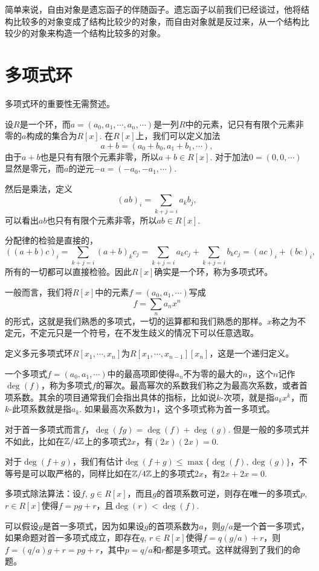 简单来说，自由对象是遗忘函子的伴随函子。遗忘函子以前我们已经谈过，他将结构比较多的对象变成了结构比较少的对象，而自由对象就是反过来，从一个结构比较少的对象来构造一个结构比较多的对象。

\para 

\section{多项式环}

多项式环的重要性无需赘述。

\para 设$R$是一个环，而$a=(a_0,a_1,\cdots,a_n,\cdots)$是一列$R$中的元素，记只有有限个元素非零的$a$构成的集合为$R[x]$. 在$R[x]$上，我们可以定义加法
\[
	a+b=(a_0+b_0,a_1+b_1,\cdots),
\]
由于$a+b$也是只有有限个元素非零，所以$a+b \in R[x]$. 对于加法$0=(0,0,\cdots)$显然是零元，而$a$的逆元$-a=(-a_0,-a_1,\cdots)$.

然后是乘法，定义
\[
	(ab)_i=\sum_{k+j=i}a_kb_j,
\]
可以看出$ab$也只有有限个元素非零，所以$ab\in R[x]$.

分配律的检验是直接的，
\[
	((a+b)c)_i=\sum_{k+j=i}(a+b)_kc_j=\sum_{k+j=i}a_kc_j+\sum_{k+j=i}b_kc_j=(ac)_i+(bc)_i,
\]
所有的一切都可以直接检验。因此$R[x]$确实是一个环，称为多项式环。

一般而言，我们将$R[x]$中的元素$f=(a_0,a_1,\cdots)$写成
\[
	f=\sum_{n}a_n x^n
\]
的形式，这就是我们熟悉的多项式，一切的运算都和我们熟悉的那样。$x$称之为不定元，不定元只是一个符号，在不发生歧义的情况下可以任意选取。

\para 定义多元多项式环$R[x_1,\cdots,x_n]$为$R[x_1,\cdots,x_{n-1}][x_n]$，这是一个递归定义。

\para 一个多项式$f=(a_0,a_1,\cdots)$中的最高项即使得$a_n$不为零的最大的$n$，这个$n$记作$\deg(f)$，称为多项式$f$的幂次。最高幂次的系数我们称之为最高次系数，或者首项系数。其余的项目通常我们会指出具体的指标，比如说$k$-次项，就是指$a_kx^k$，而$k$-此项系数就是指$a_k$. 如果最高次系数为$1$，这个多项式称为首一多项式。

对于首一多项式而言$f$，$\deg(fg)=\deg(f)+\deg(g)$. 但是一般的多项式并不如此，比如在$\mathbb{Z}/4\mathbb{Z}$上的多项式$2x$，有$(2x)(2x)=0$.

对于$\deg(f+g)$，我们有估计$\deg(f+g)\leq \max\{\deg(f),\deg(g)\}$，不等号是可以取严格的，同样比如在$\mathbb{Z}/4\mathbb{Z}$上的多项式$2x$，有$2x+2x=0$.

\theo 多项式除法算法：设$f$, $g\in R[x]$，而且$g$的首项系数可逆，则存在唯一的多项式$p$, $r\in R[x]$使得$f=pg+r$，且$\deg(r)< \deg(f)$.

\proof
	可以假设$g$是首一多项式，因为如果设$g$的首项系数为$a$，则$g/a$是一个首一多项式，如果命题对首一多项式成立，即存在$q$, $r\in R[x]$使得$f=q(g/a)+r$，则$f=(q/a)g+r=pg+r$，其中$p=q/a$和$r$都是多项式。这样就得到了我们的命题。

